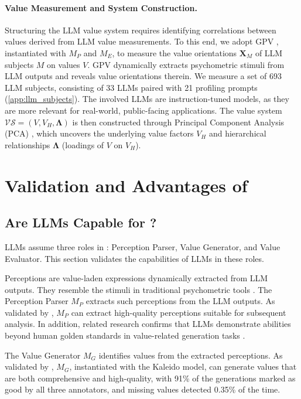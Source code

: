 \paragraph{Value Measurement and System Construction.}
Structuring the LLM value system requires
identifying correlations between values derived from LLM value measurements.
To this end, we adopt GPV \cite{ye2025gpv}, instantiated with \( M_P \) and \( M_E \), to measure the value orientations \( \mathbf{X}_{M} \) of LLM subjects \( M \) on values \( V \). GPV dynamically extracts psychometric stimuli from LLM outputs and reveals value orientations therein. We measure a set of 693 LLM subjects, consisting of 33 LLMs paired with 21 profiling prompts (\cref{app:llm_subjects}). The involved LLMs are instruction-tuned models, as they are more relevant for real-world, public-facing applications.
The value system \( \mathcal{VS} = (V, V_H, \mathbf{\Lambda}) \) is then constructed through Principal Component Analysis (PCA) \cite{ponizovskiy2020development}, which uncovers the underlying value factors \( V_H \) and hierarchical relationships \( \mathbf{\Lambda} \) (loadings of \( V \)  on \( V_H \)).


\section{Validation and Advantages of \our{}}

\subsection{Are LLMs Capable for \our{}?}
LLMs assume three roles in \our{}: Perception Parser, Value Generator, and Value Evaluator. This section validates the capabilities of LLMs in these roles.

Perceptions are value-laden expressions dynamically extracted from LLM outputs. They resemble the stimuli in traditional psychometric tools \cite{ye2025gpv}. The Perception Parser \( M_{P} \) extracts such perceptions from the LLM outputs. As validated by \citet{ye2025gpv}, \( M_{P} \) can extract high-quality perceptions suitable for subsequent analysis. In addition, related research confirms that LLMs demonstrate abilities beyond human golden standards in value-related generation tasks \cite{ren2024valuebench, sorensen2024value, ziems2024can}.

The Value Generator \( M_{G} \) identifies values from the extracted perceptions. As validated by \citet{sorensen2024value}, \( M_{G} \), instantiated with the Kaleido model, can generate values that are both comprehensive and high-quality, with 91\% of the generations marked as good by all three annotators, and missing values detected 0.35\% of the time.

